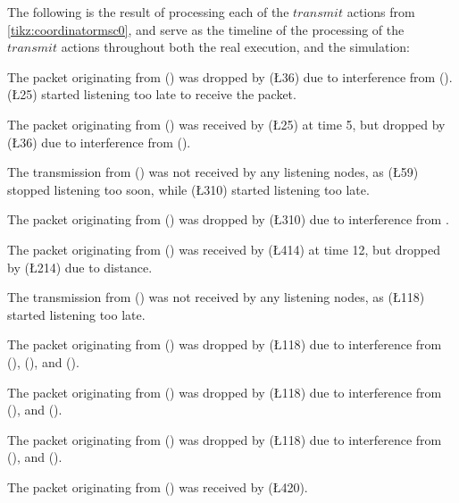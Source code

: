 The following is the result of processing each of the $\mathit{transmit}$ actions from
\autoref{tikz:coordinatormsc0}, and serve as the timeline of the processing of the $\mathit{transmit}$ actions
throughout both the real execution, and the simulation:
%
\begin{description}[leftmargin=2em,style=nextline]
    \item[\T{4}{3}] The packet originating from  () was dropped by  (\L{3}{6}) due to
          interference from  ().  (\L{2}{5}) started listening too late to receive the
          packet.
    \item[\T{1}{5}] The packet originating from  () was received by  (\L{2}{5}) at
          time 5, but dropped by  (\L{3}{6}) due to interference from  ().
    \item[\T{1}{10}] The transmission from  () was not received by any listening nodes, as
           (\L{5}{9}) stopped listening too soon, while  (\L{3}{10}) started listening too
          late.
    \item[\T{2}{10}] The packet originating from  () was dropped by  (\L{3}{10}) due
          to interference from .
    \item[\T{5}{12}] The packet originating from  () was received by  (\L{4}{14}) at
          time 12, but dropped by  (\L{2}{14}) due to distance.
    \item[\T{3}{16}] The transmission from  () was not received by any listening nodes, as
     (\L{1}{18}) started listening too late.
    \item[\T{4}{17}] The packet originating from  () was dropped by  (\L{1}{18}) due
          to interference from  (),  (), and  ().
    \item[\T{2}{18}] The packet originating from  () was dropped by  (\L{1}{18}) due
          to interference from  (), and  ().
    \item[\T{5}{18}] The packet originating from  () was dropped by  (\L{1}{18}) due
          to interference from  (), and  ().
    \item[\T{3}{20}] The packet originating from  () was received by  (\L{4}{20}).
\end{description}

